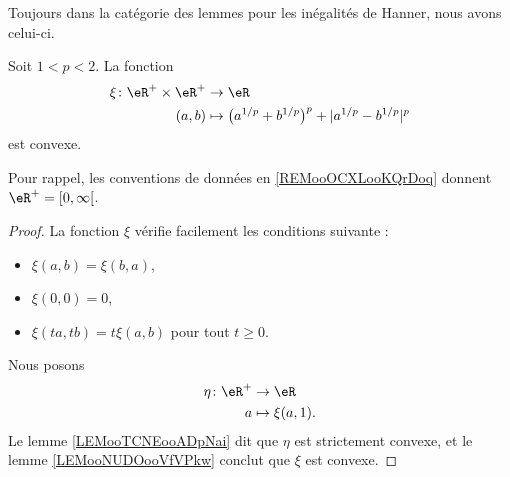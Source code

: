 	Toujours dans la catégorie des lemmes pour les inégalités de Hanner, nous avons celui-ci.
	\begin{lemma}
		Soit \( 1<p<2\). La fonction
		\begin{equation}
			\begin{aligned}
				\xi\colon \eR^+\times \eR^+ & \to \eR                                                     \\
				(a,b)                       & \mapsto \big( a^{1/p}+b^{1/p} \big)^p+| a^{1/p}-b^{1/p} |^p
			\end{aligned}
		\end{equation}
		est convexe.

		Pour rappel, les conventions de données en \ref{REMooOCXLooKQrDoq} donnent \( \eR^+=\mathopen[ 0 , \infty \mathclose[\).
	\end{lemma}

	\begin{proof}
		La fonction \( \xi\) vérifie facilement les conditions suivante :
		\begin{itemize}
			\item \( \xi(a,b)=\xi(b,a)\),
			\item \( \xi(0,0)=0\),
			\item \( \xi(ta,tb)=t\xi(a,b)\) pour tout \( t\geq 0\).
		\end{itemize}
		Nous posons
		\begin{equation}
			\begin{aligned}
				\eta\colon \eR^+ & \to \eR           \\
				a                & \mapsto \xi(a,1).
			\end{aligned}
		\end{equation}
		Le lemme \ref{LEMooTCNEooADpNai} dit que \( \eta\) est strictement convexe, et le lemme \ref{LEMooNUDOooVfVPkw} conclut que \( \xi\) est convexe.
	\end{proof}

